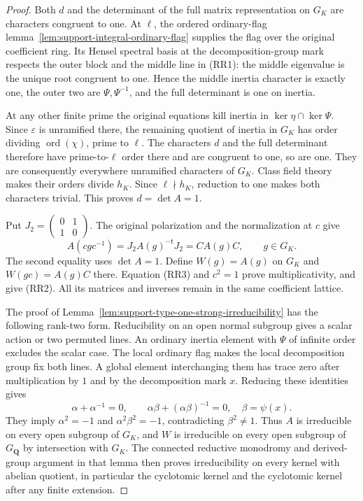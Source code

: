 \begin{proof}
Both $d$ and the determinant of the full matrix representation on
$G_K$ are characters congruent to one.  At $\ell$, the ordered
ordinary-flag lemma~\ref{lem:support-integral-ordinary-flag} supplies
the flag over the original coefficient ring.  Its Hensel spectral
basis at the decomposition-group mark respects the outer block and
the middle line in (RR1): the middle eigenvalue is the unique root
congruent to one.  Hence the middle inertia character is exactly
one, the outer two are $\Psi,\Psi^{-1}$, and the full determinant
is one on inertia.

At any other finite prime the original equations kill inertia in
$\ker\eta\cap\ker\Psi$.  Since $\varepsilon$ is unramified there,
the remaining quotient of inertia in $G_K$ has order dividing
$\operatorname{ord}(\chi)$, prime to $\ell$.  The characters $d$
and the full determinant therefore have prime-to-$\ell$ order there
and are congruent to one, so are one.  They are consequently everywhere
unramified characters of $G_K$.  Class field theory makes their orders
divide $h_K$.  Since $\ell\nmid h_K$, reduction to one makes both
characters trivial.  This proves $d=\det A=1$.

Put $J_2=\left(\begin{smallmatrix}0&1\\1&0\end{smallmatrix}\right)$.
The original polarization and the normalization at $c$ give
\[
 A(cgc^{-1})=J_2A(g)^{-\mathsf t}J_2=CA(g)C,\qquad g\in G_K.
                                                               \tag{RR3}
\]
The second equality uses $\det A=1$.  Define $W(g)=A(g)$ on
$G_K$ and $W(gc)=A(g)C$ there.  Equation (RR3) and $c^2=1$ prove
multiplicativity, and give (RR2).  All its matrices and inverses
remain in the same coefficient lattice.

The proof of Lemma~\ref{lem:support-type-one-strong-irreducibility}
has the following rank-two form.  Reducibility on an open normal
subgroup gives a scalar action or two permuted lines.  An ordinary
inertia element with $\Psi$ of infinite order excludes the scalar
case.  The local ordinary flag makes the local decomposition group
fix both lines.  A global element interchanging them has trace zero
after multiplication by $1$ and by the decomposition mark $x$.
Reducing these identities gives
\[
        \alpha+\alpha^{-1}=0,\qquad
        \alpha\beta+(\alpha\beta)^{-1}=0,
        \quad\beta=\psi(x).
\]
They imply $\alpha^2=-1$ and $\alpha^2\beta^2=-1$, contradicting
$\beta^2\ne1$.  Thus $A$ is irreducible on every open subgroup of
$G_K$, and $W$ is irreducible on every open subgroup of
$G_{\mathbf Q}$ by intersection with $G_K$.
The connected reductive monodromy and derived-group argument in
that lemma then proves irreducibility on every kernel with abelian
quotient, in particular the cyclotomic kernel and the cyclotomic
kernel after any finite extension.
\end{proof}

